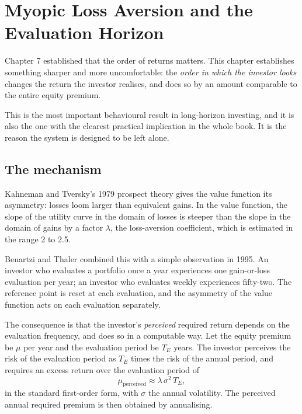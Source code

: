 
\chapter{Myopic Loss Aversion and the Evaluation Horizon}
\label{ch:myopic}

Chapter 7 established that the order of returns matters. This chapter
establishes something sharper and more uncomfortable: the \emph{order in
which the investor looks} changes the return the investor realises, and
does so by an amount comparable to the entire equity premium.

This is the most important behavioural result in long-horizon investing,
and it is also the one with the clearest practical implication in the
whole book. It is the reason the system is designed to be left alone.

\section{The mechanism}

Kahneman and Tversky's 1979 prospect theory gives the value function its
asymmetry: losses loom larger than equivalent gains. In the value
function, the slope of the utility curve in the domain of losses is
steeper than the slope in the domain of gains by a factor \(\lambda\), the
loss-aversion coefficient, which is estimated in the range 2 to 2.5.

Benartzi and Thaler combined this with a simple observation in 1995. An
investor who evaluates a portfolio once a year experiences one gain-or-loss
evaluation per year; an investor who evaluates weekly experiences
fifty-two. The reference point is reset at each evaluation, and the
asymmetry of the value function acts on each evaluation separately.

The consequence is that the investor's \emph{perceived} required return
depends on the evaluation frequency, and does so in a computable way. Let
the equity premium be \(\mu\) per year and the evaluation period be
\(T_E\) years. The investor perceives the risk of the evaluation period as
\(T_E\) times the risk of the annual period, and requires an excess return
over the evaluation period of
\begin{equation}
\mu_{\mathrm{perceived}} \approx \lambda \, \sigma^2 \, T_E,
\end{equation}
in the standard first-order form, with \(\sigma\) the annual volatility.
The perceived annual required premium is then obtained by annualising.

